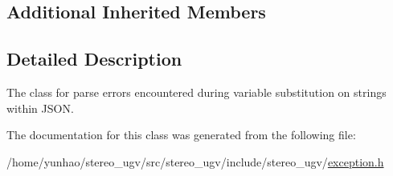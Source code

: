 \subsection*{Additional Inherited Members}


\subsection{Detailed Description}
The class for parse errors encountered during variable substitution on strings within J\+S\+ON. 

The documentation for this class was generated from the following file\+:\begin{DoxyCompactItemize}
\item 
/home/yunhao/stereo\+\_\+ugv/src/stereo\+\_\+ugv/include/stereo\+\_\+ugv/\hyperlink{exception_8h}{exception.\+h}\end{DoxyCompactItemize}
